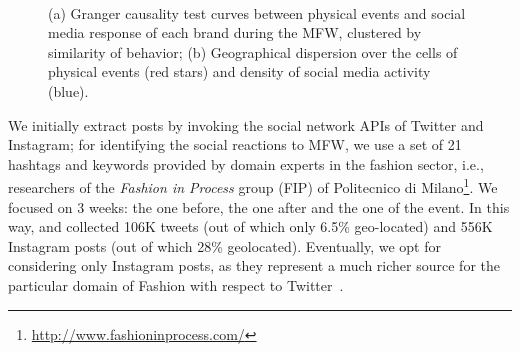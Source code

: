 \begin{figure}[p]
\centering
{}\\
\hspace{5pt} 
\caption{(a) Granger causality test curves between physical events and social media response of each brand during the MFW, clustered by similarity of behavior; (b) Geographical dispersion over the cells of physical events (red stars)
and density of social media activity (blue).}
\label{fig:fashion_fig}
\end{figure}

We initially extract posts by invoking the social network APIs of Twitter and Instagram; for identifying the social reactions to MFW, we use a set of 21 hashtags and keywords provided by domain experts in the fashion sector, i.e., researchers of the \textit{Fashion in Process} group (FIP) of Politecnico di Milano\footnote{\url{http://www.fashioninprocess.com/}}.
We focused on 3 weeks: the one before, the one after and the one of the event. In this way, \sti{} and \hivedi{} collected 106K tweets (out of which only 6.5\% geo-located) and 556K Instagram posts (out of which 28\% geolocated).
Eventually, we opt for considering only Instagram posts, as they represent a much richer source for the particular domain of Fashion with respect to Twitter~\cite{Brambilla2017, BrambillaSpatial2017}.

